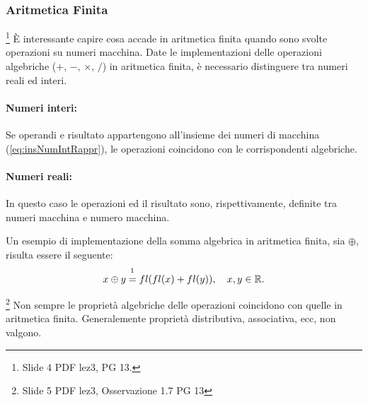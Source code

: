 \subsubsection{Aritmetica Finita}\footnote{Slide 4 PDF lez3, PG 13.}
È interessante capire cosa accade in aritmetica finita quando sono svolte operazioni su numeri macchina. Date le implementazioni delle operazioni algebriche ($+,\, -,\,\times,\, \slash$) in aritmetica finita, è necessario distinguere tra numeri reali ed interi.

\paragraph{Numeri interi:} Se operandi e risultato appartengono all'insieme dei numeri di macchina (\ref{eq:insNumIntRappr}), le operazioni coincidono con le corrispondenti algebriche.

\paragraph{Numeri reali:} In questo caso le operazioni ed il risultato sono, rispettivamente, definite tra numeri macchina e numero macchina.

Un esempio di implementazione della somma algebrica in aritmetica finita, sia $\oplus$, risulta essere il seguente:
\begin{equation*}
    x\oplus y\overset{\footnotemark}{=}fl(fl(x)+fl(y)),\quad x,y\in\mathbb R.
\end{equation*}

\begin{remark}\footnote{Slide 5 PDF lez3, Osservazione 1.7 PG 13}
    Non sempre le proprietà algebriche delle operazioni coincidono con quelle in aritmetica finita. Generalemente proprietà distributiva, associativa, ecc, non valgono.
\end{remark}

